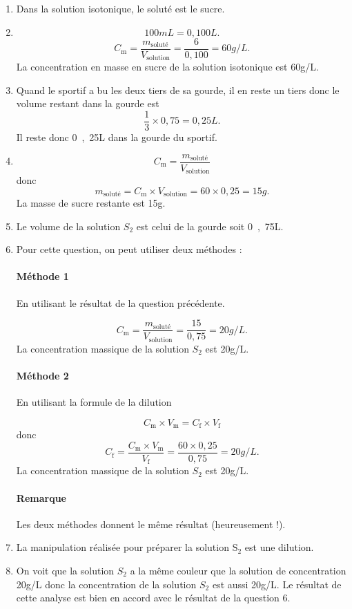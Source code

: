 \documentclass[12pt,a4paper]{article}
\begin{document}
\begin{enumerate}
\item 
Dans la solution isotonique, le soluté est le sucre.

\item
\[
\unit{100}{mL} = \unit{0{,}100}{L}.
\]
\[
C_\mathrm{m} = \frac{m_\mathrm{soluté}}{V_\mathrm{solution}} = \frac{6}{0{,}100} = \unit{60}{g/L}.
\]
La concentration en masse en sucre de la solution isotonique est \unit{60}{g/L}.

\item
Quand le sportif a bu les deux tiers de sa gourde, il en reste un tiers donc le volume restant dans la gourde est
\[
\frac{1}{3} \times 0{,}75 = \unit{0{,}25}{L}.
\]
Il reste donc \unit{0{,}25}{L} dans la gourde du sportif.

\item 
\[
C_\mathrm{m} = \frac{m_\mathrm{soluté}}{V_\mathrm{solution}}
\]
donc
\[
m_\mathrm{soluté} = C_\mathrm{m} \times V_\mathrm{solution} = 60 \times 0{,}25 = \unit{15}{g}.
\]
La masse de sucre restante est \unit{15}{g}.

\item 
Le volume de la solution $S_2$ est celui de la gourde soit \unit{0{,}75}{L}.

\item
Pour cette question, on peut utiliser deux méthodes :
\paragraph*{Méthode 1} En utilisant le résultat de la question précédente.

\[
C_\mathrm{m} = \frac{m_\mathrm{soluté}}{V_\mathrm{solution}} = \frac{15}{0{,}75} = \unit{20}{g/L}.
\]
La concentration massique de la solution $S_2$ est \unit{20}{g/L}.

\paragraph*{Méthode 2} En utilisant la formule de la dilution

\[
C_\mathrm{m} \times V_\mathrm{m} = C_\mathrm{f} \times V_\mathrm{f}
\]
donc
\[
C_\mathrm{f} = \frac{C_\mathrm{m} \times V_\mathrm{m}}{V_\mathrm{f}} = \frac{60\times 0{,}25}{0{,}75} = \unit{20}{g/L}. 
\]
La concentration massique de la solution $S_2$ est \unit{20}{g/L}.

\paragraph*{Remarque} Les deux méthodes donnent le même résultat (heureusement !).

\item

La manipulation réalisée pour préparer la solution $\mathrm{S_2}$ est une dilution.

\item 
On voit que la solution $S_2$ a la même couleur que la solution de concentration \unit{20}{g/L} donc la concentration de la solution $S_2$ est aussi \unit{20}{g/L}.
Le résultat de cette analyse est bien en accord avec le résultat de la question 6.
\end{enumerate}
\end{document}
